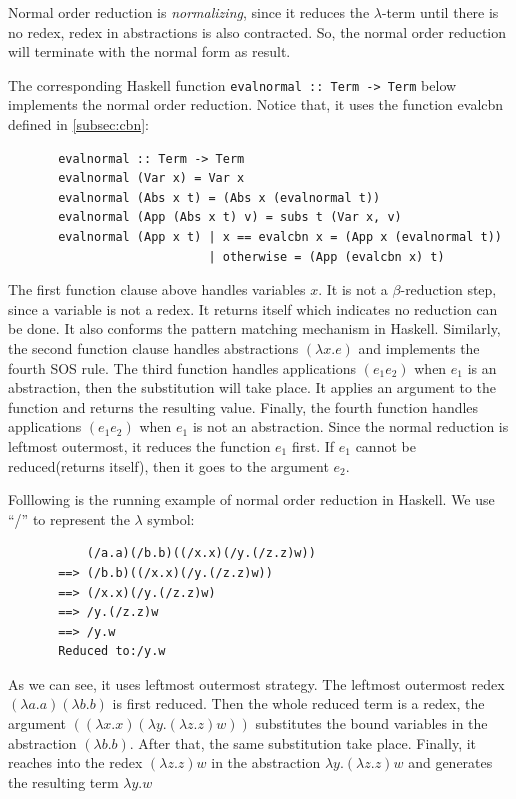 \documentclass[a4paper,11pt,twoside]{report}
\begin{document}
Normal order reduction is \textit{normalizing}, since it reduces the $\lambda$-term until there is no redex, redex in abstractions is also contracted. So, the normal order reduction will terminate with the normal form as result. 

The corresponding Haskell function \verb|evalnormal :: Term -> Term| below implements the normal order reduction. Notice that, it uses the function evalcbn defined in \ref{subsec:cbn}:

\begin{verbatim}
       evalnormal :: Term -> Term
       evalnormal (Var x) = Var x
       evalnormal (Abs x t) = (Abs x (evalnormal t))
       evalnormal (App (Abs x t) v) = subs t (Var x, v)
       evalnormal (App x t) | x == evalcbn x = (App x (evalnormal t))
                            | otherwise = (App (evalcbn x) t)
\end{verbatim}

The first function clause above handles variables $x$. It is not a $\beta$-reduction step, since a variable is not a redex. It returns itself which indicates no reduction can be done. It also conforms the pattern matching mechanism in Haskell. Similarly, the second function clause handles abstractions $(\lambda x.e)$ and implements the fourth SOS rule. The third function handles applications $(e_1e_2)$ when $e_1$ is an abstraction, then the substitution will take place. It applies an argument to the function and returns the resulting value. Finally, the fourth function handles  applications $(e_1e_2)$ when $e_1$ is not an abstraction. Since the normal reduction is leftmost outermost, it reduces the function $e_1$ first. If $e_1$ cannot be reduced(returns itself), then it goes to the argument $e_2$. 


Folllowing is the running example of normal order reduction in Haskell. We use ``/'' to represent the $\lambda$ symbol:

\begin{verbatim}
           (/a.a)(/b.b)((/x.x)(/y.(/z.z)w))
       ==> (/b.b)((/x.x)(/y.(/z.z)w))
       ==> (/x.x)(/y.(/z.z)w)
       ==> /y.(/z.z)w
       ==> /y.w
       Reduced to:/y.w
\end{verbatim}


As we can see, it uses leftmost outermost strategy. The leftmost outermost redex $(\lambda a.a)(\lambda b.b)$ is first reduced. Then the whole reduced term is a redex, the argument $((\lambda x.x)(\lambda y.(\lambda z.z)w))$ substitutes the bound variables in the abstraction $(\lambda b.b)$. After that, the same substitution take place. Finally, it reaches into the redex $(\lambda z.z)w$ in the abstraction $\lambda y.(\lambda z.z)w$ and generates the resulting term $\lambda y.w$
\end{document}
